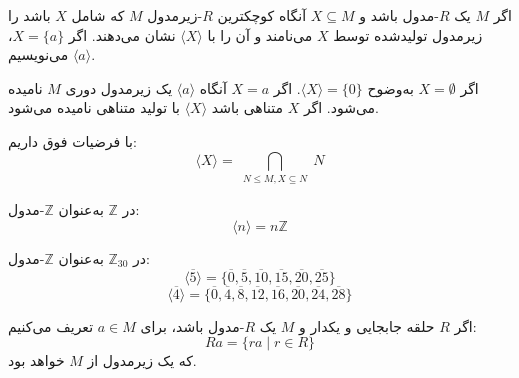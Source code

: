 \begin{frame}
    \begin{definition}
        اگر $M$ یک $R$-مدول باشد و $X \subseteq M$ آنگاه کوچکترین $R$-زیرمدول $M$ که شامل $X$ باشد را زیرمدول تولیدشده توسط $X$ می‌نامند و آن را با $\langle X \rangle$ نشان می‌دهند.
        اگر $X = \{ a \}$، می‌نویسیم $\langle a \rangle$.

        اگر
        \(X = \emptyset\)
        به‌وضوح
        \(\langle X \rangle = \{0\}\).
        اگر
        \(X = {a}\)
        آنگاه
        \(\langle a \rangle\)
        یک زیرمدول دوری
        \(M\)
        نامیده می‌شود. اگر
        \(X\)
        متناهی باشد
        $\langle X \rangle$
        با تولید متناهی نامیده می‌شود.
    \end{definition}

    \begin{lemma}
        با فرضیات فوق داریم:
        \[
            \langle X \rangle = \bigcap_{\substack{N \leqslant M ,  X \subseteq N}} N
        \]
    \end{lemma}


\end{frame}


\begin{frame}
    \begin{example}
        در $\mathbb{Z}$ به‌عنوان $\mathbb{Z}$-مدول:
        \[
            \langle n \rangle = n \mathbb{Z}
        \]

    \end{example}

    \begin{example}
        در $\mathbb{Z}_{30}$ به‌عنوان $\mathbb{Z}$-مدول:
        \[
            \langle \overline{5} \rangle = \{ \overline{0}, \overline{5}, \overline{10}, \overline{15}, \overline{20}, \overline{25} \}
        \]
        \[
            \langle \overline{4} \rangle = \{ \overline{0}, \overline{4}, \overline{8}, \overline{12}, \overline{16}, \overline{20}, \overline{24}, \overline{28} \}
        \]
    \end{example}


\end{frame}

\begin{frame}

    \begin{definition}
        اگر $R$ حلقه جابجایی و یکدار و $M$ یک $R$-مدول باشد، برای $a \in M$ تعریف می‌کنیم:
        \[
            Ra = \{ ra \mid r \in R \}
        \]
        که یک زیرمدول از $M$ خواهد بود.

    \end{definition}

\end{frame}

